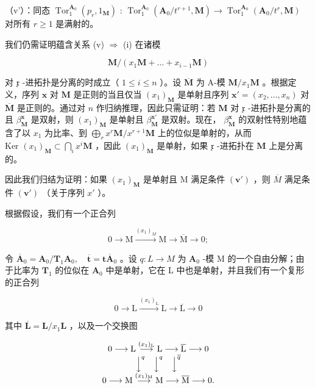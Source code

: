 （v'）：同态 \(\operatorname{Tor}_{1}^{\mathbf{A}_{0}}(p_{r},1_{\mathbf{M}})\) : \(\operatorname{Tor}_{1}^{\mathbf{A}_{0}}(\mathbf{A}_{0}/t^{r+1},\mathbf{M})\to\operatorname{Tor}_{1}^{\mathbf{A}_{0}}(\mathbf{A}_{0}/t^{r},\mathbf{M})\) 对所有 \(r\geqslant1\) 是满射的。

我们仍需证明蕴含关系 (v) \(\Rightarrow\) (i) 在诸模

\[
\mathbf {M} / (x _ {1} \mathbf {M} + \dots + x _ {i - 1} \mathbf {M})
\]

对 \(\mathfrak{x}\) -进拓扑是分离的时成立（ \(1 \leqslant i \leqslant n\) ）。设 \(\overline{\mathbf{M}}\) 为 A-模 \(\mathbf{M}/x_1 \mathbf{M}\) 。根据定义，序列 \(\mathbf{x}\) 对 \(\mathbf{M}\) 是正则的当且仅当 \((x_1)_\mathbf{M}\) 是单射且序列 \(\mathbf{x}' = (x_2, \ldots, x_n)\) 对 \(\overline{\mathbf{M}}\) 是正则的。通过对 \(n\) 作归纳推理，因此只需证明：若 \(\mathbf{M}\) 对 \(\mathfrak{x}\) -进拓扑是分离的且 \(\beta_{\mathbf{M}}^{\mathbf{x}}\) 是双射，则 \((x_1)_\mathbf{M}\) 是单射且 \(\beta_{\mathbf{M}}^{\mathbf{x}'}\) 是双射。现在， \(\beta_{\mathbf{M}}^{\mathbf{x}}\) 的双射性特别地蕴含了以 \(x_1\) 为比率、到 \(\bigoplus_{r} x^r \mathbf{M}/x^{r+1} \mathbf{M}\) 上的位似是单射的，从而 \(\text{Ker } (x_1)_\mathbf{M} \subset \bigcap_{i} x^i \mathbf{M}\) ，因此 \((x_1)_\mathbf{M}\) 是单射，如果 \(\mathfrak{x}\) -进拓扑在 \(\mathbf{M}\) 上是分离的。

因此我们归结为证明：如果 \((x_{1})_{\mathbf{M}}\) 是单射且 M 满足条件 \((\mathbf{v}')\) ，则 \(\overline{M}\) 满足条件 \((\mathbf{v}')\) （关于序列 \(x'\) ）。

根据假设，我们有一个正合列

\[
0 \longrightarrow \mathrm{M} \xrightarrow {(x _ {1}) _ {M}} \mathrm{M} \longrightarrow \overline {{\mathrm{M}}} \longrightarrow 0;
\]

令 \(\overline{\mathbf{A}}_{0} = \mathbf{A}_{0}/\mathbf{T}_{1}\mathbf{A}_{0},\quad\overline{\mathbf{t}} = \mathbf{t}\overline{\mathbf{A}}_{0}\) 。设 \(q:L\to M\) 为 \(\mathbf{A}_{0}\) -模 M 的一个自由分解；由于比率为 \(\mathbf{T}_{1}\) 的位似在 \(\mathbf{A}_{0}\) 中是单射，它在 L 中也是单射，并且我们有一个复形的正合列

\[
0 \longrightarrow \mathrm{L} \xrightarrow {(x _ {1}) _ {\mathrm{L}}} \mathrm{L} \longrightarrow \overline {{\mathrm{L}}} \longrightarrow 0
\]

其中 \(\overline{\mathbf{L}} = \mathbf{L} / x_1\mathbf{L}\) ，以及一个交换图

\[
\begin{array}{c} 0 \longrightarrow \mathrm{L} \stackrel {(x _ {1}) _ {\mathrm{L}}} {\longrightarrow} \mathrm{L} \longrightarrow \overline {{\mathrm{L}}} \longrightarrow 0 \\ \Big \downarrow^ {q} \quad \Big \downarrow^ {q} \quad \Big \downarrow^ {\overline {{q}}} \\ 0 \longrightarrow \mathrm{M} \stackrel {(x _ {1}) _ {\mathrm{M}}} {\longrightarrow} \mathrm{M} \longrightarrow \overline {{\mathrm{M}}} \longrightarrow 0. \end{array}
\]

